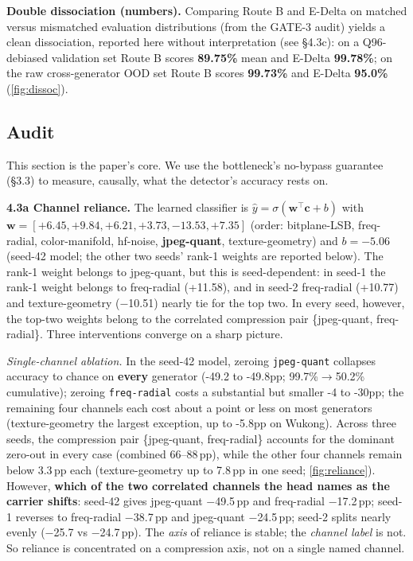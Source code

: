 

\textbf{Double dissociation (numbers).} Comparing Route B and E-Delta on matched versus mismatched evaluation distributions (from the GATE-3 audit) yields a clean dissociation, reported here without interpretation (see \S{}4.3c): on a Q96-debiased validation set Route B scores \textbf{89.75\%} mean and E-Delta \textbf{99.78\%}; on the raw cross-generator OOD set Route B scores \textbf{99.73\%} and E-Delta \textbf{95.0\%} (\autoref{fig:dissoc}).

\subsection{Audit}

This section is the paper's core. We use the bottleneck's no-bypass guarantee (\S{}3.3) to measure, causally, what the detector's accuracy rests on.

\textbf{4.3a Channel reliance.} The learned classifier is \(\hat{y}=\sigma(\mathbf{w}^\top\mathbf{c}+b)\) with \(\mathbf{w}=[+6.45,+9.84,+6.21,+3.73,\mathbf{-13.53},+7.35]\) (order: bitplane-LSB, freq-radial, color-manifold, hf-noise, \textbf{jpeg-quant}, texture-geometry) and \(b=-5.06\) (seed-42 model; the other two seeds' rank-1 weights are reported below). The rank-1 weight belongs to jpeg-quant, but this is seed-dependent: in seed-1 the rank-1 weight belongs to freq-radial (+11.58), and in seed-2 freq-radial (+10.77) and texture-geometry ($-$10.51) nearly tie for the top two. In every seed, however, the top-two weights belong to the correlated compression pair \{jpeg-quant, freq-radial\}. Three interventions converge on a sharp picture.

\emph{Single-channel ablation.} In the seed-42 model, zeroing \texttt{jpeg-quant} collapses accuracy to chance on \textbf{every} generator (-49.2 to -49.8pp; 99.7\%\ensuremath{\rightarrow}50.2\% cumulative); zeroing \texttt{freq-radial} costs a substantial but smaller -4 to -30pp; the remaining four channels each cost about a point or less on most generators (texture-geometry the largest exception, up to -5.8pp on Wukong). Across three seeds, the compression pair \{jpeg-quant, freq-radial\} accounts for the dominant zero-out in every case (combined 66--88\,pp), while the other four channels remain below 3.3\,pp each (texture-geometry up to 7.8\,pp in one seed; \autoref{fig:reliance}). However, \textbf{which of the two correlated channels the head names as the carrier shifts}: seed-42 gives jpeg-quant $-$49.5\,pp and freq-radial $-$17.2\,pp; seed-1 reverses to freq-radial $-$38.7\,pp and jpeg-quant $-$24.5\,pp; seed-2 splits nearly evenly ($-$25.7 vs $-$24.7\,pp). The \emph{axis} of reliance is stable; the \emph{channel label} is not. So reliance is concentrated on a compression axis, not on a single named channel.

